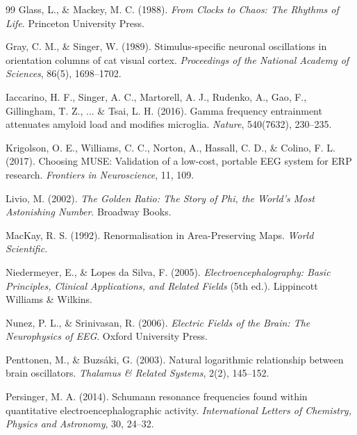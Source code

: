 \documentclass[11pt,a4paper]{article}
\begin{document}
\begin{thebibliography}{99}
Glass, L., \& Mackey, M. C. (1988).
\newblock \textit{From Clocks to Chaos: The Rhythms of Life}.
\newblock Princeton University Press.

Gray, C. M., \& Singer, W. (1989).
\newblock Stimulus-specific neuronal oscillations in orientation columns of cat visual cortex.
\newblock \textit{Proceedings of the National Academy of Sciences}, 86(5), 1698--1702.

Iaccarino, H. F., Singer, A. C., Martorell, A. J., Rudenko, A., Gao, F., Gillingham, T. Z., ... \& Tsai, L. H. (2016).
\newblock Gamma frequency entrainment attenuates amyloid load and modifies microglia.
\newblock \textit{Nature}, 540(7632), 230--235.

Krigolson, O. E., Williams, C. C., Norton, A., Hassall, C. D., \& Colino, F. L. (2017).
\newblock Choosing MUSE: Validation of a low-cost, portable EEG system for ERP research.
\newblock \textit{Frontiers in Neuroscience}, 11, 109.

Livio, M. (2002).
\newblock \textit{The Golden Ratio: The Story of Phi, the World's Most Astonishing Number}.
\newblock Broadway Books.

MacKay, R. S. (1992).
\newblock Renormalisation in Area-Preserving Maps.
\newblock \textit{World Scientific}.

Niedermeyer, E., \& Lopes da Silva, F. (2005).
\newblock \textit{Electroencephalography: Basic Principles, Clinical Applications, and Related Fields} (5th ed.).
\newblock Lippincott Williams \& Wilkins.

Nunez, P. L., \& Srinivasan, R. (2006).
\newblock \textit{Electric Fields of the Brain: The Neurophysics of EEG}.
\newblock Oxford University Press.

Penttonen, M., \& Buzs{\'a}ki, G. (2003).
\newblock Natural logarithmic relationship between brain oscillators.
\newblock \textit{Thalamus \& Related Systems}, 2(2), 145--152.

Persinger, M. A. (2014).
\newblock Schumann resonance frequencies found within quantitative electroencephalographic activity.
\newblock \textit{International Letters of Chemistry, Physics and Astronomy}, 30, 24--32.


\end{thebibliography}
\end{document}
